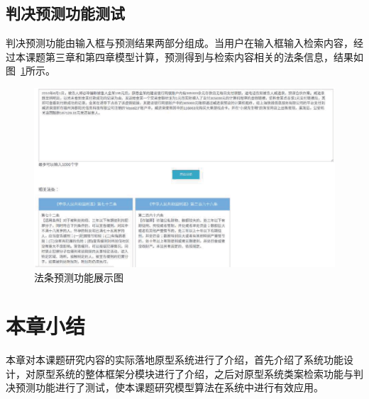 \subsection{判决预测功能测试}
判决预测功能由输入框与预测结果两部分组成。当用户在输入框输入检索内容，经过本课题第三章和第四章模型计算，预测得到与检索内容相关的法条信息，结果如图~\ref{fig:sys_article}所示。
\begin{figure}[htbp]%
    \centering
    \includegraphics[scale=0.4, clip=true]{./sources/sys_article.eps}
    \caption{\label{fig:sys_article}法条预测功能展示图}
\end{figure}

\section{本章小结}
本章对本课题研究内容的实际落地原型系统进行了介绍，首先介绍了系统功能设计，对原型系统的整体框架分模块进行了介绍，之后对原型系统类案检索功能与判决预测功能进行了测试，使本课题研究模型算法在系统中进行有效应用。